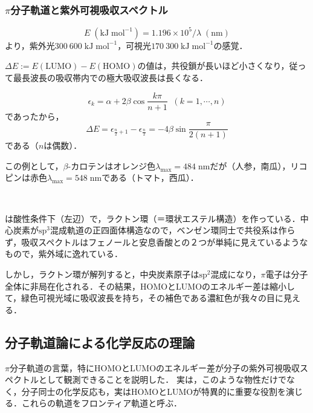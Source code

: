 \documentclass[uplatex, dvipdfmx]{jsreport}
\begin{document}
\subsubsection{$\pi$分子軌道と紫外可視吸収スペクトル}

\begin{fact}[紫外可視光のエネルギー]
    \[ E\;(\mathrm{kJ\;mol^{-1}}) = 1.196\times 10^5/\lambda\; (\mathrm{nm}) \]
より，紫外光$300~600\;\mathrm{kJ\;mol^{-1}}$，可視光$170~300\;\mathrm{kJ\;mol^{-1}}$の感覚．
\end{fact}
\begin{fact}
    $\Delta E:=E(\mathrm{LUMO})-E(\mathrm{HOMO})$の値は，共役鎖が長いほど小さくなり，従って最長波長の吸収帯内での極大吸収波長は長くなる．
\end{fact}
\begin{example}[直鎖共役ポリエンで考える]
    \[ \epsilon_k=\alpha+2\beta\cos\frac{k\pi}{n+1}\;\;(k=1,\cdots,n)\]
    であったから，
    \[\Delta E=\epsilon_{\frac{n}{2}+1}-\epsilon_{\frac{n}{2}}=-4\beta\sin\frac{\pi}{2(n+1)}\]
    である（$n$は偶数）．

    この例として，$\beta$-カロテンはオレンジ色$\lambda_{\mathrm{max}}=484\;\mathrm{nm}$だが（人参，南瓜），リコピンは赤色$\lambda_{\mathrm{max}}=548\;\mathrm{nm}$である（トマト，西瓜）．
\end{example}
\begin{example}[phenolphthalein]　

    は酸性条件下（左辺）で，ラクトン環（＝環状エステル構造）を作っている．中心炭素が$\mathrm{sp}^3$混成軌道の正四面体構造なので，ベンゼン環同士で共役系は作らず，吸収スペクトルはフェノールと安息香酸との２つが単純に見えているようなもので，紫外域に逸れている．

    しかし，ラクトン環が解列すると，中央炭素原子は$\mathrm{sp}^2$混成になり，$\pi$電子は分子全体に非局在化される．その結果，HOMOとLUMOのエネルギー差は縮小して，緑色可視光域に吸収波長を持ち，その補色である濃紅色が我々の目に見える．
\end{example}

\subsection{分子軌道論による化学反応の理論}

$\pi$分子軌道の言葉，特にHOMOとLUMOのエネルギー差が分子の紫外可視吸収スペクトルとして観測できることを説明した．
実は，このような物性だけでなく，分子同士の化学反応も，実はHOMOとLUMOが特異的に重要な役割を演じる．これらの軌道をフロンティア軌道と呼ぶ．
\end{document}
